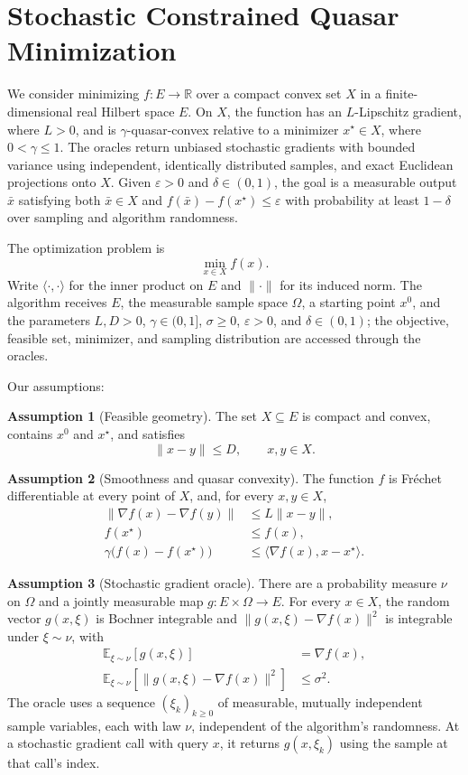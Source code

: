 \documentclass[10pt]{article}
\theoremstyle{definition}
\newtheorem{assumption}{Assumption}
\begin{document}
\section*{Stochastic Constrained Quasar Minimization}
We consider minimizing $f:E\to\mathbb{R}$ over a compact convex set $X$ in a finite-dimensional real Hilbert space $E$. On $X$, the function has an $L$-Lipschitz gradient, where $L>0$, and is $\gamma$-quasar-convex relative to a minimizer $x^\star\in X$, where $0<\gamma\leq1$. The oracles return unbiased stochastic gradients with bounded variance using independent, identically distributed samples, and exact Euclidean projections onto $X$. Given $\varepsilon>0$ and $\delta\in(0,1)$, the goal is a measurable output $\bar{x}$ satisfying both $\bar{x}\in X$ and $f(\bar{x})-f(x^\star)\leq\varepsilon$ with probability at least $1-\delta$ over sampling and algorithm randomness.

The optimization problem is
\[
\min_{x\in X} f(x).
\]
Write $\langle\cdot,\cdot\rangle$ for the inner product on $E$ and $\|\cdot\|$ for its induced norm. The algorithm receives $E$, the measurable sample space $\Omega$, a starting point $x^0$, and the parameters $L,D>0$, $\gamma\in(0,1]$, $\sigma\geq0$, $\varepsilon>0$, and $\delta\in(0,1)$; the objective, feasible set, minimizer, and sampling distribution are accessed through the oracles.

Our assumptions:
\begin{assumption}[Feasible geometry]
The set $X\subseteq E$ is compact and convex, contains $x^0$ and $x^\star$, and satisfies
\[
\|x-y\|\leq D,\qquad x,y\in X.
\]
\end{assumption}

\begin{assumption}[Smoothness and quasar convexity]
The function $f$ is Fr\'echet differentiable at every point of $X$, and, for every $x,y\in X$,
\[
\begin{aligned}
\|\nabla f(x)-\nabla f(y)\|&\leq L\|x-y\|,\\
f(x^\star)&\leq f(x),\\
\gamma\bigl(f(x)-f(x^\star)\bigr)
&\leq\langle\nabla f(x),x-x^\star\rangle.
\end{aligned}
\]
\end{assumption}

\begin{assumption}[Stochastic gradient oracle]
There are a probability measure $\nu$ on $\Omega$ and a jointly measurable map $g:E\times\Omega\to E$. For every $x\in X$, the random vector $g(x,\xi)$ is Bochner integrable and $\|g(x,\xi)-\nabla f(x)\|^2$ is integrable under $\xi\sim\nu$, with
\[
\begin{aligned}
\mathbb{E}_{\xi\sim\nu}[g(x,\xi)]&=\nabla f(x),\\
\mathbb{E}_{\xi\sim\nu}
 [\|g(x,\xi)-\nabla f(x)\|^2]&\leq\sigma^2.
\end{aligned}
\]
The oracle uses a sequence $(\xi_k)_{k\geq0}$ of measurable, mutually independent sample variables, each with law $\nu$, independent of the algorithm's randomness. At a stochastic gradient call with query $x$, it returns $g(x,\xi_k)$ using the sample at that call's index.
\end{assumption}
\end{document}
